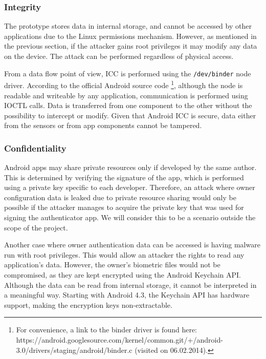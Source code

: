 \subsubsection*{Integrity}
The prototype stores data in internal storage, and cannot be accessed by other applications due to the Linux permissions mechanism. However, as mentioned in the previous section, if the attacker gains root privileges it may modify any data on the device. The attack can be performed regardless of physical access.

From a data flow point of view, ICC is performed using the {\tt /dev/binder} node driver. According to the official Android source code \footnote{For convenience, a link to the binder driver is found here: https://android.googlesource.com/kernel/common.git/+/android-3.0/drivers/staging/android/binder.c (visited on 06.02.2014).}, although the node is readable and writeable by any application, communication is performed using IOCTL calls. Data is transferred from one component to the other without the possibility to intercept or modify. Given that Android ICC is secure, data either from the sensors or from app components cannot be tampered.

\subsubsection*{Confidentiality}
Android apps may share private resources only if developed by the same author. This is determined by verifying the signature of the app, which is performed using a private key specific to each developer. Therefore, an attack where owner configuration data is leaked due to private resource sharing would only be possible if the attacker manages to acquire the private key that was used for signing the authenticator app. We will consider this to be a scenario outside the scope of the project.

Another case where owner authentication data can be accessed is having malware run with root privileges. This would allow an attacker the rights to read any application's data. However, the owner's biometric files would not be compromised, as they are kept encrypted using the Android Keychain API. Although the data can be read from internal storage, it cannot be interpreted in a meaningful way. Starting with Android 4.3, the Keychain API has hardware support, making the encryption keys non-extractable. 

